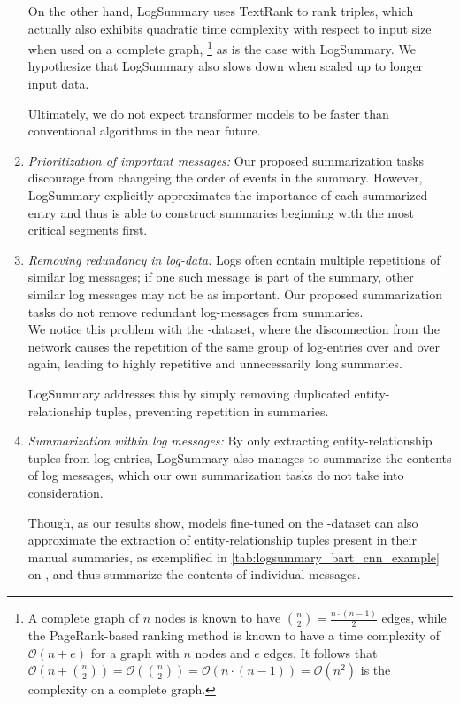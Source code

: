 \begin{enumerate}
      On the other hand, LogSummary uses TextRank to rank triples, which actually also exhibits
      quadratic time complexity with respect to input size when used on a complete graph,%
      \footnote{A complete graph of \(n\) nodes is known to have \(\binom{n}{2} = \frac{n \cdot (n - 1)}{2}\) edges,
      while the PageRank-based ranking method is known to have a time complexity of
      \(\mathcal{O}(n + e)\) for a graph with \(n\) nodes and \(e\) edges.
      It follows that \(\mathcal{O}(n + \binom{n}{2}) = \mathcal{O}(\binom{n}{2}) = \mathcal{O}(n \cdot (n - 1)) = \mathcal{O}(n^2)\) is the complexity on a complete graph.}
      as is the case with LogSummary.
      We hypothesize that LogSummary also slows down when scaled up to longer input data.

      Ultimately, we do not expect transformer models to be faster than conventional algorithms in the near future.
\item \emph{Prioritization of important messages:} Our proposed summarization tasks
      discourage from changeing the order of events in the summary.
      However, LogSummary explicitly approximates the importance of each summarized entry and
      thus is able to construct summaries beginning with the most critical segments first.
\item \emph{Removing redundancy in log-data:} Logs often contain multiple repetitions of similar log messages;
      if one such message is part of the summary, other similar log messages may not be as important.
      Our proposed summarization tasks do not remove redundant log-messages from summaries.\\
      We notice this problem with the \hadoop{}-dataset,
      where the disconnection from the network causes the repetition of the same group of log-entries over and over again,
      leading to highly repetitive and unnecessarily long summaries.

      LogSummary addresses this by simply removing duplicated entity-relationship tuples,
      preventing repetition in summaries.
\item \emph{Summarization within log messages:} By only extracting entity-relationship tuples from log-entries,
      LogSummary also manages to summarize the contents of log messages, which our own summarization tasks do not take into consideration.

      Though, as our results show, models fine-tuned on the \logsummary{}-dataset can also approximate
      the extraction of entity-relationship tuples present in their manual summaries,
      as exemplified in \autoref{tab:logsummary_bart_cnn_example} on ,
      and thus summarize the contents of individual messages.
\end{enumerate}

